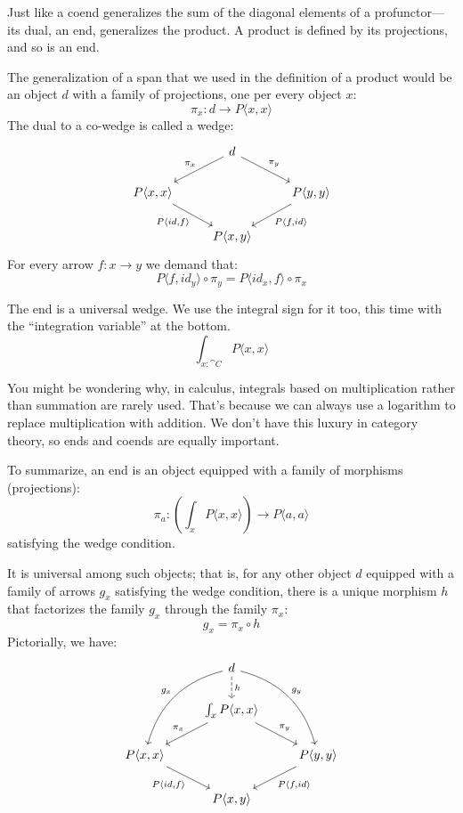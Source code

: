 \documentclass[DaoFP]{subfiles}
\begin{document}
Just like a coend generalizes the sum of the diagonal elements of a profunctor---its dual, an end, generalizes the product. A product is defined by its projections, and so is an end. 

The generalization of a span that we used in the definition of a product would be an object $d$ with a family of projections, one per every object $x$:
\[ \pi_x \colon d \to P \langle x, x \rangle \]
The dual to a co-wedge is called a wedge:
\[
 \begin{tikzcd}
 &d
 \arrow[ld, "\pi_x"']
 \arrow[rd, "\pi_y"]
 \\
 P \langle x, x \rangle
 \arrow[dr, "{P \langle id, f \rangle}"']
 &&P \langle y, y \rangle
 \arrow[dl, "{P \langle f, id \rangle}"]
 \\
 & P \langle x, y \rangle
 \end{tikzcd}
\]
For every arrow $f \colon x \to y$ we demand that:
\[ P \langle f, id_y \rangle \circ \pi_y = P \langle id_x, f \rangle \circ \pi_x \]

The end is a universal wedge. We use the integral sign for it too, this time with the ``integration variable'' at the bottom. 
\[ \int_{x \colon \cat C} P \langle x, x \rangle \]

You might be wondering why, in calculus, integrals based on multiplication rather than summation are rarely used. That's because we can always use a logarithm to replace multiplication with addition. We don't have this luxury in category theory, so ends and coends are equally important.

To summarize, an end is an object equipped with a family of morphisms (projections):
\[ \pi_a \colon \left( \int_x P \langle x, x \rangle \right) \to P \langle a, a \rangle \]
satisfying the wedge condition. 

It is universal among such objects; that is, for any other object $d$ equipped with a family of arrows $g_x$ satisfying the wedge condition, there is a unique morphism $h$ that factorizes the family $g_x$ through the family $\pi_x$:
\[ g_x = \pi_x \circ h \]
Pictorially, we have:
\[
 \begin{tikzcd}
 &d
 \arrow[ddl, bend right, "g_x"']
 \arrow[ddr, bend left, "g_y"]
 \arrow[d, dashed, "h"]
 \\
 & \int_x P \langle x, x \rangle
 \arrow[ld, "\pi_x"']
 \arrow[rd, "\pi_y"]
 \\
 P \langle x, x \rangle
 \arrow[dr, "{P \langle id, f \rangle}"']
 &&P \langle y, y \rangle
 \arrow[dl, "{P \langle f, id \rangle}"]
 \\
 & P \langle x, y \rangle
 \end{tikzcd}
\]
\end{document}
